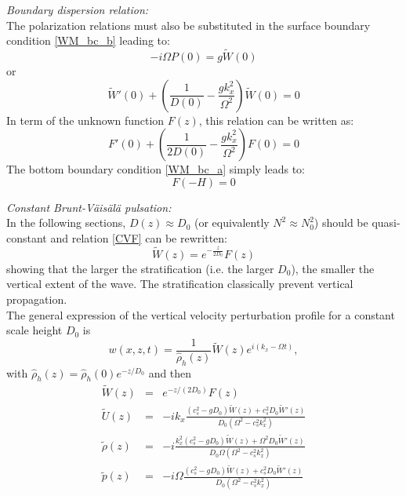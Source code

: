 \documentclass[a4paper,11pt]{article}
\begin{document}
\textit{Boundary dispersion relation:}\\
The polarization relations must also be substituted in the surface boundary condition \ref{WM_bc_b} leading to:
\begin{equation}
  \displaystyle
  -i\Omega P(0)=g \widetilde{W}(0)
\end{equation}
or
\begin{equation}
  \displaystyle
  \widetilde{W}'(0)+\left(
  \frac{1}{D(0)}-\frac{gk_x^2}{\Omega^2}
  \right)\widetilde{W}(0)=0
\end{equation}
In term of the unknown function $F(z)$, this relation can be written as:
\begin{equation}
  \displaystyle
  F'(0)+\left(
  \frac{1}{2D(0)}-\frac{gk_x^2}{\Omega^2}
  \right)F(0)=0
  \label{eqFbc}
\end{equation}
The bottom boundary condition \ref{WM_bc_a} simply leads to:
\begin{equation}
  \displaystyle
  F(-H)=0
  \label{eqFbc2}
\end{equation}

\textit{Constant Brunt-Väisälä pulsation:}\\
In the following sections, $D(z)\approx D_0$ (or equivalently $N^2\approx N_0^2$) should be quasi-constant and relation \ref{CVF} can be rewritten:
\begin{equation}
  \displaystyle
  \widetilde{W}(z)=e^{-\frac{z}{2D_0}}F(z)
  \label{CVF2}
\end{equation}
showing that the larger the stratification (i.e. the larger $D_0$), the smaller the vertical extent of the wave. The stratification classically prevent vertical propagation.\\
The general expression of the vertical velocity perturbation profile for a constant scale height $D_0$ is
\begin{equation}
  \displaystyle
  w(x,z,t)=\frac{1}{\hat{\rho}_h(z)}\widetilde{W}(z)e^{i(k_x-\Omega t)},
\end{equation}
with $\hat{\rho}_h(z)=\hat{\rho}_h(0)e^{-z/D_0}$ and then
\begin{equation}
  \displaystyle
  \begin{array}{rcl}
  	\widetilde{W}(z)&=&e^{-z/(2D_0)}F(z)\\[4mm]
    \widetilde{U}(z)&=&\displaystyle  -ik_x\frac{(c_s^2-gD_0)\widetilde{W}(z)+c_s^2D_0\widetilde{W}'(z)}{D_0(\Omega^2-c_s^2k_x^2)}\\[4mm]
    \widetilde{\rho}(z)&=&\displaystyle -i\frac{k_x^2(c_s^2-gD_0)\widetilde{W}(z)+\Omega^2D_0\widetilde{W}'(z)}{D_0\Omega(\Omega^2-c_s^2k_x^2)}\\[4mm]
    \widetilde{p}(z)&=&\displaystyle -i\Omega\frac{(c_s^2-gD_0)\widetilde{W}(z)+c_s^2D_0\widetilde{W}'(z)}{D_0(\Omega^2-c_s^2k_x^2)}
\end{array}
\end{equation}
\end{document}
